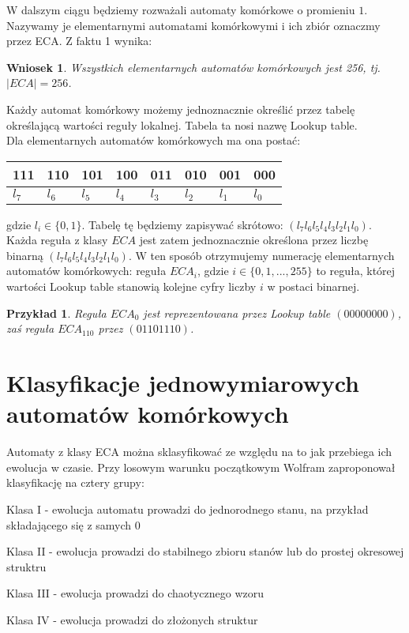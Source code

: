 \documentclass{xmgr}
\newtheorem{corollary}{Wniosek}
\newtheorem{example}{Przykład}
\begin{document}
W dalszym ciągu będziemy rozważali automaty komórkowe o promieniu $1$. Nazywamy je elementarnymi automatami komórkowymi i ich zbiór oznaczmy przez
ECA. Z faktu 1 wynika:

\begin{corollary}
 Wszystkich elementarnych automatów komórkowych jest 256, tj. $|ECA| = 256$.
\end{corollary}

Każdy automat komórkowy możemy jednoznacznie określić przez tabelę określającą wartości reguły lokalnej. Tabela ta nosi nazwę Lookup table.
\\Dla elementarnych automatów komórkowych ma ona postać:

\begin{center}
    \begin{tabular}{| l | l | l | l | l | l | l | l |}
    \hline
    111 & 110 & 101 & 100 & 011 & 010 & 001 & 000 \\ \hline
    $l_{7}$ & $l_{6}$ & $l_{5}$ & $l_{4}$ & $l_{3}$ & $l_{2}$ & $l_{1}$ & $l_{0}$ \\ \hline
    \end{tabular}
\end{center}
gdzie $l_{i} \in \{0,1\}$. Tabelę tę będziemy zapisywać skrótowo: $(l_{7}l_{6}l_{5}l_{4}l_{3}l_{2}l_{1}l_{0})$.
\\Każda reguła z klasy $ECA$ jest zatem jednoznacznie określona przez liczbę binarną $(l_{7}l_{6}l_{5}l_{4}l_{3}l_{2}l_{1}l_{0})$. W ten sposób
otrzymujemy numerację elementarnych automatów komórkowych: reguła $ECA_{i}$, gdzie $i \in \{0, 1, ..., 255\}$ to reguła, której wartości
Lookup table stanowią kolejne cyfry liczby $i$ w postaci binarnej.

\begin{example}
 Reguła $ECA_{0}$ jest reprezentowana przez Lookup table $(00000000)$, zaś reguła $ECA_{110}$ przez $(01101110)$.
\end{example}

\section{Klasyfikacje jednowymiarowych automatów komórkowych}
Automaty z klasy ECA można sklasyfikować ze względu na to jak przebiega ich ewolucja w czasie. Przy losowym warunku początkowym Wolfram zaproponował
klasyfikację na cztery grupy:
\enumerate
\item Klasa I - ewolucja automatu prowadzi do jednorodnego stanu, na przykład składającego się z samych 0
\item Klasa II - ewolucja prowadzi do stabilnego zbioru stanów lub do prostej okresowej struktru
\item Klasa III - ewolucja prowadzi do chaotycznego wzoru
\item Klasa IV - ewolucja prowadzi do złożonych struktur
\end{document}
